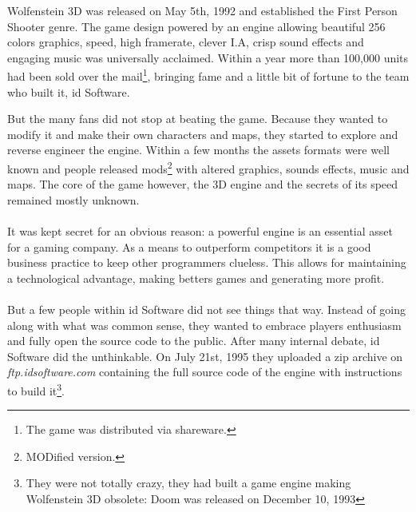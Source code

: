 Wolfenstein 3D was released on May 5th, 1992 and established the First Person Shooter genre. The game design powered by an engine allowing beautiful 256 colors graphics, speed, high framerate, clever I.A, crisp sound effects and engaging music was universally acclaimed. Within a year more than 100,000 units had been sold over the mail\footnote{The game was distributed via shareware.}, bringing fame and a little bit of fortune to the team who built it, id Software.\\
\par
\begin{figure}[H]
\centering
{}
\end{figure}
\par
But the many fans did not stop at beating the game. Because they wanted to modify it and make their own characters and maps, they started to explore and reverse engineer the engine. Within a few months the assets formats were well known and people released mods\footnote{MODified version.} with altered graphics, sounds effects, music and maps. The core of the game however, the 3D engine and the secrets of its speed remained mostly unknown.\\
\\
It was kept secret for an obvious reason: a powerful engine is an essential asset for a gaming company. As a means to outperform competitors it is a good business practice to keep other programmers clueless. This allows for maintaining a technological advantage, making betters games and generating more profit.\\
\\
But a few people within id Software did not see things that way. Instead of going along with what was common sense, they wanted to embrace players enthusiasm and fully open the source code to the public. After many internal debate, id Software did the unthinkable. On July 21st, 1995 they uploaded a zip archive on \emph{ftp.idsoftware.com} containing the full source code of the engine with instructions to build it\footnote{They were not totally crazy, they had built a game engine making Wolfenstein 3D obsolete: Doom was released on December 10, 1993}.\\


